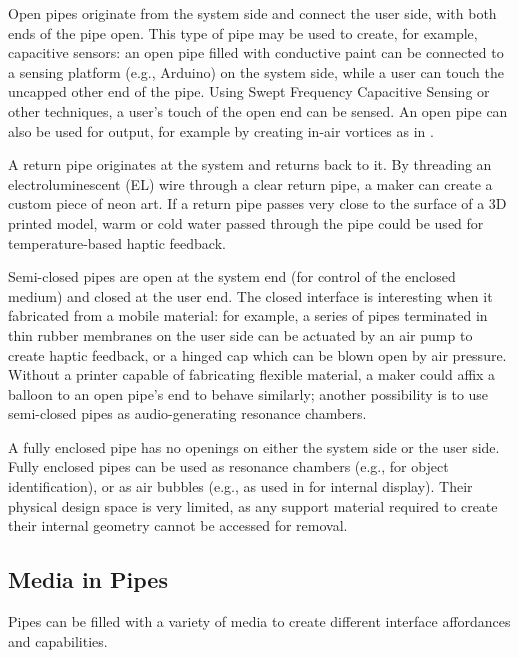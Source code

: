 Open pipes originate from the system side and connect the user side, with both ends of the pipe open. This type of pipe may be used to create, for example, capacitive sensors: an open pipe filled with conductive paint can be connected to a sensing platform (e.g., Arduino) on the system side, while a user can touch the uncapped other end of the pipe.  Using Swept Frequency Capacitive Sensing \cite{Sato-touche} or other techniques, a user's touch of the open end can be sensed.  An open pipe can also be used for output, for example by creating in-air vortices as in \cite{Sodhi-aireal}.

A return pipe originates at the system and returns back to it.  By threading an electroluminescent (EL) wire through a clear return pipe, a maker can create a custom piece of neon art.  If a return pipe passes very close to the surface of a 3D printed model, warm or cold water passed through the pipe could be used for temperature-based haptic feedback.

Semi-closed pipes are open at the system end (for control of the enclosed medium) and closed at the user end.  The closed interface is interesting when it fabricated from a mobile material: for example, a series of pipes terminated in thin rubber membranes on the user side can be actuated by an air pump to create haptic feedback, or a hinged cap which can be blown open by air pressure.  Without a printer capable of fabricating flexible material, a maker could affix a balloon to an open pipe's end to behave similarly; another possibility is to use semi-closed pipes as audio-generating resonance chambers.

A fully enclosed pipe has no openings on either the system side or the user side.  Fully enclosed pipes can be used as resonance chambers (e.g., for object identification), or as air bubbles (e.g., as used in \cite{Willis-printedoptics} for internal display).     Their physical design space is very limited, as any support material required to create their internal geometry cannot be accessed for removal.

\subsection{Media in Pipes}

Pipes can be filled with a variety of media to create different interface affordances and capabilities.

